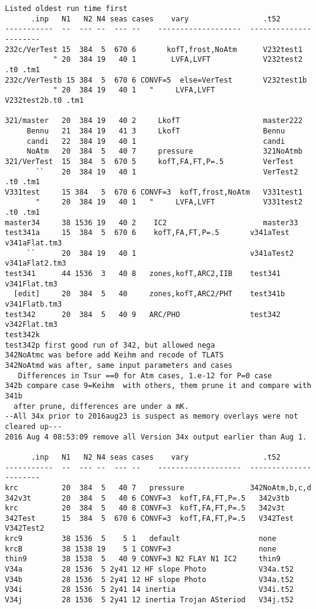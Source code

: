 \documentclass{article}
\begin{document}
\vspace{-3.mm} 
\begin{verbatim}
Listed oldest run time first
      .inp   N1   N2 N4 seas cases    vary                 .t52
-----------  --  --- --  --- --    -------------------  ---------------------- 
232c/VerTest 15  384  5  670 6       kofT,frost,NoAtm      V232test1
           " 20  384 19   40 1        LVFA,LVFT            V232test2 .t0 .tm1
232c/VerTestb 15 384  5  670 6 CONVF=5  else=VerTest       V232test1b
           " 20  384 19   40 1   "     LVFA,LVFT           V232test2b.t0 .tm1

321/master   20  384 19   40 2     LkofT                   master222
     Bennu   21  384 19   41 3     LkofT                   Bennu
     candi   22  384 19   40 1                             candi 
     NoAtm   20  384  5   40 7     pressure                321NoAtmb
321/VerTest  15  384  5  670 5     kofT,FA,FT,P=.5         VerTest
       ``    20  384 19   40 1                             VerTest2  .t0 .tm1
V331test     15 384   5  670 6 CONVF=3  kofT,frost,NoAtm   V331test1
       "     20  384 19   40 1   "     LVFA,LVFT           V331test2 .t0 .tm1
master34     38 1536 19   40 2    IC2                      master33
test341a     15  384  5  670 6    kofT,FA,FT,P=.5       v341aTest   v341aFlat.tm3
     ``      20  384 19   40 1                          v341aTest2 v341aFlat2.tm3
test341      44 1536  3   40 8   zones,kofT,ARC2,IIB    test341      v341Flat.tm3
  [edit]     20  384  5   40     zones,kofT,ARC2/PHT    test341b    v341Flatb.tm3
test342      20  384  5   40 9   ARC/PHO                test342      v342Flat.tm3
test342k
test342p first good run of 342, but allowed nega
342NoAtmc was before add Keihm and recode of TLATS
342NoAtmd was after, same input parameters and cases
   Differences in Tsur ==0 for Atm cases, 1.e-12 for P=0 case
342b compare case 9=Keihm  with others, them prune it and compare with 341b
  after prune, differences are under a mK. 
--All 34x prior to 2016aug23 is suspect as memory overlays were not cleared up---
2016 Aug 4 08:53:09 remove all Version 34x output earlier than Aug 1.

      .inp   N1   N2 N4 seas cases    vary                 .t52
-----------  --  --- --  --- --    -------------------  ----------------------
krc          20  384  5   40 7   pressure               342NoAtm,b,c,d 
342v3t       20  384  5   40 6 CONVF=3  kofT,FA,FT,P=.5   342v3tb
krc          20  384  5   40 8 CONVF=3  kofT,FA,FT,P=.5   342v3t
342Test      15  384  5  670 6 CONVF=3  kofT,FA,FT,P=.5   V342Test  V342Test2
krc9         38 1536  5    5 1   default                  none
krcB         38 1538 19    5 1 CONVF=3                    none
thin9        38 1538  5   40 9 CONVF=3 N2 FLAY N1 IC2     thin9
V34a         28 1536  5 2y41 12 HF slope Photo            V34a.t52
V34b         28 1536  5 2y41 12 HF slope Photo            V34a.t52
V34i         28 1536  5 2y41 14 inertia                   V34i.t52 
V34j         28 1536  5 2y41 12 inertia Trojan ASteriod   V34j.t52  

\end{verbatim} 
\end{document}

